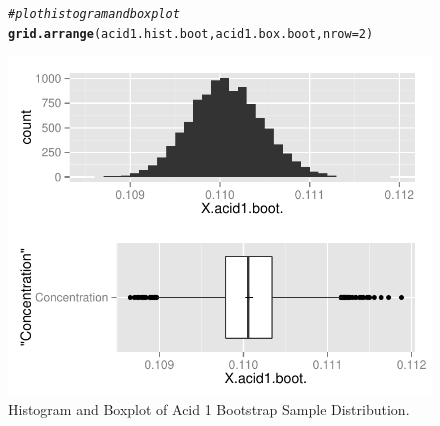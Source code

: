 \documentclass{article}\usepackage[]{graphicx}\usepackage[]{color}
\makeatletter
\def\maxwidth{ %
  \ifdim\Gin@nat@width>\linewidth
    \linewidth
  \else
    \Gin@nat@width
  \fi
}
\newcommand{\hlnum}[1]{\textcolor[rgb]{0.686,0.059,0.569}{#1}}%
\newcommand{\hlcom}[1]{\textcolor[rgb]{0.678,0.584,0.686}{\textit{#1}}}%
\newcommand{\hlstd}[1]{\textcolor[rgb]{0.345,0.345,0.345}{#1}}%
\newcommand{\hlkwc}[1]{\textcolor[rgb]{0.333,0.667,0.333}{#1}}%
\newcommand{\hlkwd}[1]{\textcolor[rgb]{0.737,0.353,0.396}{\textbf{#1}}}%
\newenvironment{kframe}{%
 \def\at@end@of@kframe{}%
 \ifinner\ifhmode%
  \def\at@end@of@kframe{\end{minipage}}%
  \begin{minipage}{\columnwidth}%
 \fi\fi%
 \def\FrameCommand##1{\hskip\@totalleftmargin \hskip-\fboxsep
 \colorbox{shadecolor}{##1}\hskip-\fboxsep
     \hskip-\linewidth \hskip-\@totalleftmargin \hskip\columnwidth}%
 \MakeFramed {\advance\hsize-\width
   \@totalleftmargin\z@ \linewidth\hsize
   \@setminipage}}%
 {\par\unskip\endMakeFramed%
 \at@end@of@kframe}
\newenvironment{knitrout}{}{} %
\makeatother
\begin{document}
\begin{figure}[H]  \begin{center}
\begin{knitrout}
\color{fgcolor}\begin{kframe}
\begin{alltt}
\hlcom{# plot histogram and boxplot}
\hlkwd{grid.arrange}\hlstd{(acid1.hist.boot, acid1.box.boot,} \hlkwc{nrow} \hlstd{=} \hlnum{2}\hlstd{)}
\end{alltt}
\end{kframe}
\includegraphics[width=\maxwidth]{figure/2_acid1_bootbox_plot} 

\end{knitrout}
\end{center} \caption{Histogram and Boxplot of Acid 1 Bootstrap Sample Distribution.} \end{figure}
\end{document}
